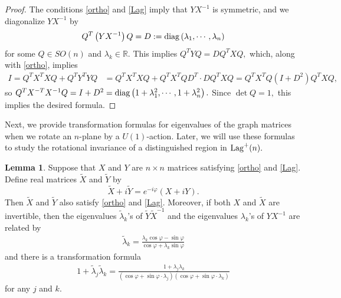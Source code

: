 \documentclass[11pt]{amsart}
\numberwithin{equation}{section}
\theoremstyle{definition}
\theoremstyle{definition}
\newtheorem{lemma}[equation]{Lemma}
\newcommand{\pr}[1]{\left(#1\right)}
\newcommand{\bb}[1]{\mathbb{#1}} \newcommand{\td}[1]{\widetilde{#1}}
\begin{document}
\begin{proof}
	The conditions \eqref{ortho} and \eqref{Lag} imply that $YX^{-1}$ is symmetric, and we diagonalize  $YX^{-1}$ by
	\begin{align*}
	Q^{T}\pr{YX^{-1}}Q 
	=D
	:= {\rm diag}\pr{\lambda_1,\cdots,\lambda_n}
	\end{align*}
	for some $Q\in {SO}(n)$ and $\lambda_k\in\bb R.$
	This implies $Q^{T}YQ = DQ^{T}XQ,$ which, along with \eqref{ortho}, implies
	\begin{align*}
	I= Q^TX^TXQ + Q^TY^TYQ
	& = Q^TX^TXQ + Q^TX^TQ D^T\cdot 
	DQ^{T}XQ
	= Q^TX^TQ \pr{I + D^2} Q^TXQ,
	\end{align*}
	so 
	$Q^TX^{-T}X^{-1}Q
	= I+D^2
	= {\rm diag}\pr{1+\lambda_1^2,\cdots,1+\lambda_n^2}.$
	Since $\det Q=1,$ this implies the desired formula.
\end{proof}

Next, we provide transformation formulas for eigenvalues of the graph matrices when we rotate an $n$-plane by a ${U}(1)$-action.
Later, we will use these formulas to study the rotational invariance of a distinguished region in ${\rm Lag}^+(n).$


\begin{lemma}
	\label{lem:lambda-rotate}
	Suppose that $X$ and $Y$ are $n\times n$ matrices satisfying \eqref{ortho} and \eqref{Lag}. 
	Define real matrices $\widetilde X$ and $\widetilde Y$ by
	\[
	\widetilde X+i\widetilde Y=e^{-i\varphi}(X+iY).
	\]
	Then $\widetilde X$ and $\widetilde Y$ also satisfy \eqref{ortho} and \eqref{Lag}. 
	Moreover, if both $X$ and $\widetilde X$ are invertible, then
	the eigenvalues $\widetilde\lambda_k$'s of
	$\widetilde Y\widetilde X^{-1}$ and the eigenvalues $\lambda_k$'s of
	$YX^{-1}$ are related by
	\begin{align*}
	\widetilde\lambda_k
	=
	\frac{\lambda_k\cos\varphi-\sin\varphi}
	{\cos\varphi+\lambda_k\sin\varphi}
	\end{align*}
	and there is a transformation formula
	\begin{align}\label{product-transf}
	1 + \td\lambda_j \td\lambda_k
	= \frac{1+\lambda_j\lambda_k}{\pr{\cos\varphi + \sin\varphi\cdot \lambda_j}\pr{\cos\varphi + \sin\varphi\cdot \lambda_k}}
	\end{align}
	for any $j$ and $k.$
\end{lemma}
\end{document}
